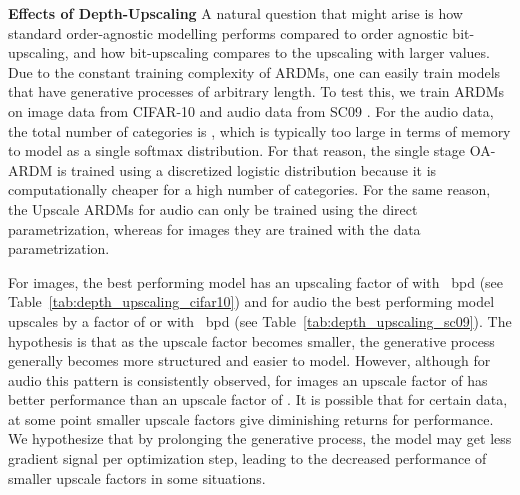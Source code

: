 \documentclass{article} \usepackage{iclr2022_conference,times}
\begin{document}
\textbf{Effects of Depth-Upscaling} \hspace{.2cm}
A natural question that might arise is how standard order-agnostic modelling performs compared to order agnostic bit-upscaling, and how bit-upscaling compares to the upscaling with larger values. Due to the constant training complexity of ARDMs, one can easily train models that have generative processes of arbitrary length. To test this, we train ARDMs on image data from CIFAR-10 and audio data from SC09 \citep{speechcommandsv2}. For the audio data, the total number of categories is , which is typically too large in terms of memory to model as a single softmax distribution. For that reason, the single stage OA-ARDM is trained using a discretized logistic distribution because it is computationally cheaper for a high number of categories. For the same reason, the Upscale ARDMs for audio can only be trained using the direct parametrization, whereas for images they are trained with the data parametrization. 


For images, the best performing model has an upscaling factor of  with ~bpd (see Table~\ref{tab:depth_upscaling_cifar10}) and for audio the best performing model upscales by a factor of  or  with ~bpd (see Table~\ref{tab:depth_upscaling_sc09}). The hypothesis is that as the upscale factor becomes smaller, the generative process generally becomes more structured and easier to model. However, although for audio this pattern is consistently observed, for images an upscale factor of  has better performance than an upscale factor of . It is possible that for certain data, at some point smaller upscale factors give diminishing returns for performance. We hypothesize that by prolonging the generative process, the model may get less gradient signal per optimization step, leading to the decreased performance of smaller upscale factors in some situations.
\end{document}
